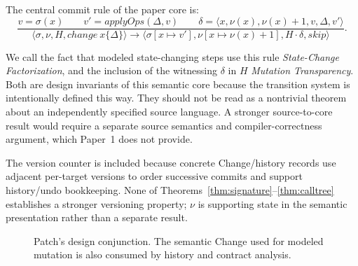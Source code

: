 \documentclass[10pt]{article}
\theoremstyle{plain}
\theoremstyle{remark}
\begin{document}
The central commit rule of the paper core is:
\[
\frac{
 v=\sigma(x) \qquad
 v'=applyOps(\Delta,v) \qquad
 \delta=\langle x,\nu(x),\nu(x)+1,v,\Delta,v'\rangle
}{
 \langle\sigma,\nu,H,change~x\{\Delta\}\rangle
 \longrightarrow
 \langle\sigma[x\mapsto v'],\nu[x\mapsto\nu(x)+1],H\cdot\delta,skip\rangle
}.
\]

We call the fact that modeled state-changing steps use this rule \emph{State-Change Factorization}, and the inclusion of the witnessing $\delta$ in $H$ \emph{Mutation Transparency}. Both are design invariants of this semantic core because the transition system is intentionally defined this way. They should not be read as a nontrivial theorem about an independently specified source language. A stronger source-to-core result would require a separate source semantics and compiler-correctness argument, which Paper~1 does not provide.

The version counter is included because concrete Change/history records use adjacent per-target versions to order successive commits and support history/undo bookkeeping. None of Theorems~\ref{thm:signature}--\ref{thm:calltree} establishes a stronger versioning property; $\nu$ is supporting state in the semantic presentation rather than a separate result.

\begin{figure}[t]
\centering
{}
\caption{Patch's design conjunction. The semantic Change used for modeled mutation is also consumed by history and contract analysis.}
\label{fig:architecture}
\end{figure}
\end{document}

